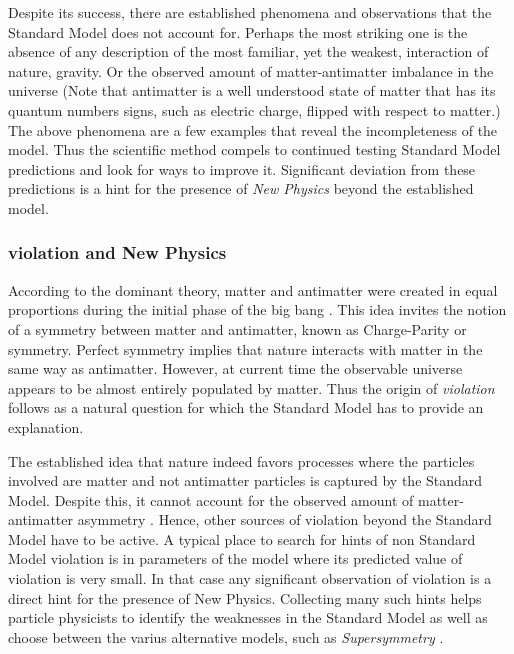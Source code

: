 Despite its success, there are established phenomena and observations that the Standard
Model does not account for. Perhaps the most striking one is the absence of any description
of the most familiar, yet the weakest, interaction of nature, gravity. Or the
observed amount of matter-antimatter imbalance in the universe \cite{more-cpv-huet,more-cpv-gavela_I,more-cpv-gavela_II}
(Note that antimatter is a well understood state of matter that has its quantum numbers signs,
such as electric charge, flipped with respect to matter.) The above phenomena are a few
examples that reveal the incompleteness of the model. Thus the scientific method compels
to continued testing Standard Model predictions and look for ways to improve it.
Significant deviation from these predictions is a hint for the presence of {\it New Physics}
beyond the established model.

\subsubsection{\CP violation and New Physics}
According to the dominant theory, matter and antimatter were created in equal proportions
during the initial phase of the big bang \cite{more-cpv-huet,more-cpv-gavela_I,more-cpv-gavela_II}.
This idea invites the notion of a symmetry between matter and antimatter, known as Charge-Parity
or \CP symmetry. Perfect \CP symmetry implies that nature interacts with matter in the same
way as antimatter. However, at current time the observable universe
appears to be almost entirely populated by matter. Thus the origin of {\it \CP  violation}
follows as a natural question for which the Standard Model has to provide an explanation.

The established idea that nature indeed favors processes where the particles involved
are matter and not antimatter particles is captured by the Standard Model.
Despite this, it cannot account for the observed amount of matter-antimatter asymmetry \cite{more-cpv-huet,more-cpv-gavela_I,more-cpv-gavela_II}.
Hence, other sources of \CP violation beyond the Standard Model have to be active.
A typical place to search for hints of non Standard Model \CP violation is in parameters
of the model where its predicted value of \CP violation is very small. In that case any
significant observation of \CP violation is a direct hint for the presence of New Physics.
Collecting many such hints helps particle physicists to identify the weaknesses in the
Standard Model as well as choose between the varius alternative models, such as {\it Supersymmetry}
 \eg \cite{Golfand:1971iw,Volkov:1973ix,Wess:1974tw}.


